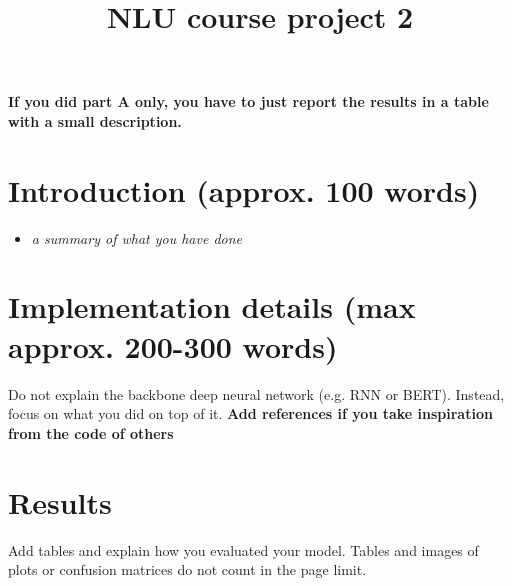 \documentclass[a4paper]{article}
\title{NLU course project 2}
\begin{document}
\maketitle

\textbf{If you did part A only, you have to just report the results in a table with a small description.}

\section{Introduction (approx. 100 words)}
\begin{itemize}
    \item \textit{a summary of what you have done}
\end{itemize}
\section{Implementation details (max approx. 200-300 words)}
Do not explain the backbone deep neural network (e.g. RNN or BERT). Instead, focus on what you did on top of it. \textbf{Add references if you take inspiration from the code of others}

\section{Results}
Add tables and explain how you evaluated your model. Tables and images of plots or confusion matrices do not count in the page limit.





\end{document}
